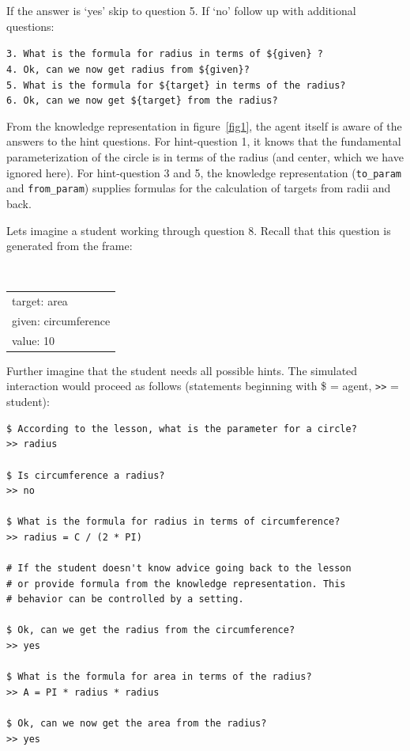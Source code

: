 \documentclass[10pt,letterpaper]{article}
\begin{document}
If the answer is `yes' skip to question 5. If `no' follow up with additional questions:

{\tt 3. What is the formula for radius in terms of \$\{given\} ?} \\[0.1in]
{\tt 4. Ok, can we now get radius from \$\{given\}?} \\[0.1in]
{\tt 5. What is the formula for \$\{target\} in terms of the radius?}\\[0.1in]
{\tt 6. Ok, can we now get \$\{target\} from the radius?}

From the knowledge representation in figure~\ref{fig1}, the agent itself is aware of the answers to the hint questions. For hint-question 1, it knows that the fundamental parameterization of the circle is in terms of the radius (and center, which we have ignored here). For hint-question 3 and 5, the knowledge representation ({\tt to\_param} and {\tt from\_param}) supplies formulas for the calculation of targets from radii and back. 

Lets imagine a student working through question 8. Recall that this question is generated from the frame:

\begin{center}
    {\tt
        \begin{tabular}{ |l|  }
          \hline
          target: area \\
          given: circumference\\
          value: 10\\
          \hline  
        \end{tabular}
    }
\end{center}

Further imagine that the student needs all possible hints. The simulated interaction would proceed as follows  (statements beginning with \$ = agent,  \verb|>>| = student):
\begin{framed}
\begin{small}
\begin{verbatim}
$ According to the lesson, what is the parameter for a circle?
>> radius

$ Is circumference a radius?
>> no

$ What is the formula for radius in terms of circumference?
>> radius = C / (2 * PI)

# If the student doesn't know advice going back to the lesson
# or provide formula from the knowledge representation. This
# behavior can be controlled by a setting.

$ Ok, can we get the radius from the circumference?
>> yes

$ What is the formula for area in terms of the radius?
>> A = PI * radius * radius

$ Ok, can we now get the area from the radius?
>> yes
\end{verbatim}
\end{small}
\end{framed}
\end{document}
